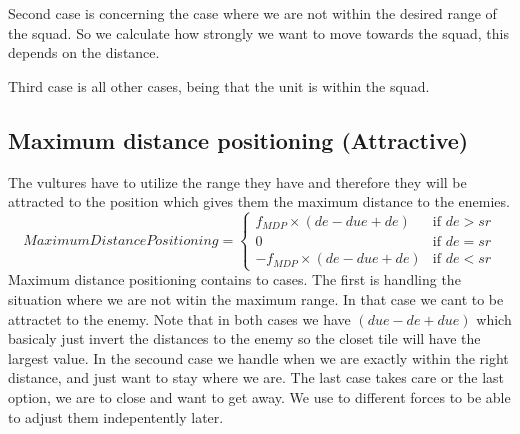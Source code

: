 		Second case  is concerning the case where we are not within the desired range of the squad. So we calculate how strongly we want to move towards the squad, this depends on the distance. 
		
		Third case is all other cases, being that the unit is within the squad.
					
	\subsection*{Maximum distance positioning (Attractive)}
		The vultures have to utilize the range they have and therefore they will be attracted to the position which gives them the maximum distance 
		to the enemies.
		\begin{displaymath}
			MaximumDistancePositioning = \begin{cases}
					f_{MDP} \times (de - due + de) & \text{if } de > sr\\
					0 & \text{if } de = sr\\
					-f_{MDP} \times (de - due + de) & \text{if } de < sr
				\end{cases}		
		\end{displaymath}
		Maximum distance positioning contains to cases. The first is handling the situation where we are not witin the maximum range. In that case we cant to be attractet to the enemy. Note that in both cases we have $(due - de + due)$ which basicaly just invert the distances to the enemy so the closet tile will have the largest value.
		In the secound case we handle when we are exactly within the right distance, and just want to stay where we are.
		The last case takes care or the last option, we are to close and want to get away.
		We use to different forces to be able to adjust them indepentently later.
		
		
		
